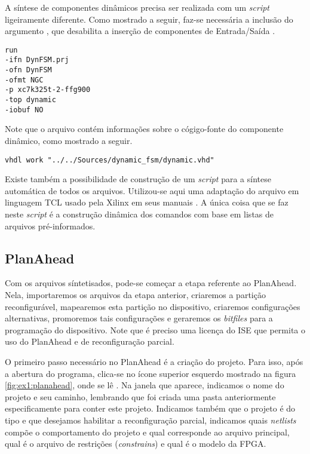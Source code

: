 \documentclass[11pt,a4paper,oneside]{book}
\begin{document}
A síntese de componentes dinâmicos precisa ser realizada com um \textit{script}  ligeiramente diferente.
Como mostrado a seguir, faz-se necessária a inclusão do argumento , que desabilita a inserção de componentes de Entrada/Saída \cite{ug743, ug748}.
\begin{lstlisting}[style=customVHDL]
run
-ifn DynFSM.prj
-ofn DynFSM
-ofmt NGC
-p xc7k325t-2-ffg900
-top dynamic
-iobuf NO
\end{lstlisting}
Note que o arquivo  contém informações sobre o cógigo-fonte do componente dinâmico, como mostrado a seguir.
\begin{lstlisting}[style=customVHDL]
vhdl work "../../Sources/dynamic_fsm/dynamic.vhd"
\end{lstlisting}

Existe também a possibilidade de construção de um \textit{script} para a síntese automática de todos os arquivos.
Utilizou-se aqui uma adaptação do arquivo em linguagem TCL usado pela Xilinx em seus manuais \cite{ug702, ug743, ug744}.
A única coisa que se faz neste \textit{script} é a construção dinâmica dos comandos com base em listas de arquivos pré-informados.

\subsection{PlanAhead}
Com os arquivos síntetisados, pode-se começar a etapa referente ao PlanAhead.
Nela, importaremos os arquivos da etapa anterior, criaremos a partição reconfigurável, mapearemos esta partição no dispositivo, criaremos configurações alternativas, promoremos tais configurações e geraremos os \textit{bitfiles} para a programação do dispositivo.
Note que é preciso uma licença do ISE que permita o uso do PlanAhead e de reconfiguração parcial.

O primeiro passo necessário no PlanAhead é a criação do projeto.
Para isso, após a abertura do programa, clica-se no ícone superior esquerdo mostrado na figura \ref{fig:ex1:planahead}, onde se lê .
Na janela que aparece, indicamos o nome do projeto e seu caminho, lembrando que foi criada uma pasta anteriormente especificamente para conter este projeto.
Indicamos também que o projeto é do tipo  e que desejamos habilitar a reconfiguração parcial, indicamos quais \textit{netlists} compõe o comportamento do projeto e qual corresponde ao arquivo principal, qual é o arquivo de restrições (\textit{constrains}) e qual é o modelo da FPGA.
\end{document}
